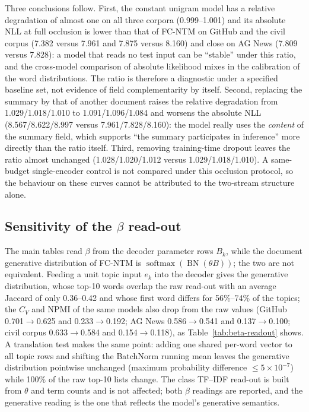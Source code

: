 \documentclass[11pt]{article}
\newcommand{\fcntm}{FC-NTM}
\begin{document}
Three conclusions follow. First, the constant unigram model has a relative degradation of almost
one on all three corpora (0.999--1.001) and its absolute NLL at full occlusion is lower than that
of \fcntm{} on GitHub and the civil corpus (7.382 versus 7.961 and 7.875 versus 8.160) and close on
AG News (7.809 versus 7.828): a model that reads no test input can be ``stable'' under this ratio,
and the cross-model comparison of absolute likelihood mixes in the calibration of the word
distributions. The ratio is therefore a diagnostic under a specified baseline set, not evidence of
field complementarity by itself. Second, replacing the summary by that of another document raises
the relative degradation from 1.029/1.018/1.010 to 1.091/1.096/1.084 and worsens the absolute NLL
(8.567/8.622/8.997 versus 7.961/7.828/8.160): the model really uses the \emph{content} of the
summary field, which supports ``the summary participates in inference'' more directly than the
ratio itself. Third, removing training-time dropout leaves the ratio almost unchanged
(1.028/1.020/1.012 versus 1.029/1.018/1.010). A same-budget single-encoder control is not
compared under this occlusion protocol, so the behaviour on these curves cannot be attributed
to the two-stream structure alone.

\subsection{Sensitivity of the $\beta$ read-out}

The main tables read $\beta$ from the decoder parameter rows $B_k$, while the document generative
distribution of \fcntm{} is $\operatorname{softmax}(\operatorname{BN}(\theta B))$; the two are not
equivalent. Feeding a unit topic input $e_k$ into the decoder gives the generative distribution,
whose top-10 words overlap the raw read-out with an average Jaccard of only 0.36--0.42 and whose
first word differs for 56\%--74\% of the topics; the $C_V$ and NPMI of the same models also drop
from the raw values (GitHub 0.701$\to$0.625 and 0.233$\to$0.192; AG News 0.586$\to$0.541 and
0.137$\to$0.100; civil corpus 0.633$\to$0.584 and 0.154$\to$0.118), as Table~\ref{tab:beta-readout}
shows. A translation test makes the same point: adding one shared per-word vector to all topic
rows and shifting the BatchNorm running mean leaves the generative distribution pointwise unchanged
(maximum probability difference $\leq5\times10^{-7}$) while 100\% of the raw top-10 lists change.
The class TF--IDF read-out is built from $\theta$ and term counts and is not affected; both
$\beta$ readings are reported, and the generative reading is the one that reflects the model's
generative semantics.
\end{document}
